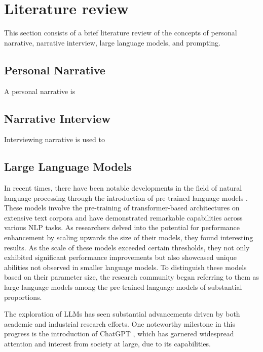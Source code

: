 \chapter{Literature review}
\label{cha:literature_review}
This section consists of a brief literature review of the concepts of personal narrative, narrative interview, large language models, and prompting. 


\section{Personal Narrative}
A personal narrative is \cite{}
\section{Narrative Interview}
Interviewing narrative is used to
\section{Large Language Models}
In recent times, there have been notable developments in the field of natural language processing through the introduction of pre-trained language models \cite{}. These models involve the pre-training of transformer-based architectures \cite{vaswani2017attention} on extensive text corpora and have demonstrated remarkable capabilities across various NLP tasks. As researchers delved into the potential for performance enhancement by scaling upwards the size of their models, they found interesting results. As the scale of these models exceeded certain thresholds, they not only exhibited significant performance improvements but also showcased unique abilities not observed in smaller language models. To distinguish these models based on their parameter size, the research community began referring to them as large language models among the pre-trained language models of substantial proportions. \cite{zhao2023survey,huang2022towards,}

The exploration of LLMs has seen substantial advancements driven by both academic and industrial research efforts. One noteworthy milestone in this progress is the introduction of ChatGPT \cite{chatgpt}, which has garnered widespread attention and interest from society at large, due to its capabilities.

